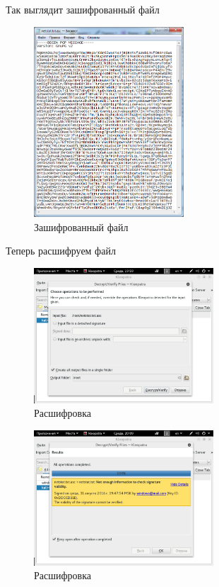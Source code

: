 Так выглядит зашифрованный файл
\begin{figure}[!ht]
	\centering
	\includegraphics[width=0.5\textwidth]{images/14.png}
	\caption{Зашифрованный файл}
\end{figure}
\newpage
Теперь расшифруем файл
\begin{figure}[!ht]
	\centering
	\includegraphics[width=0.6\textwidth]{images/16.png}
	\caption{Расшифровка}
\end{figure}
\begin{figure}[!ht]
	\centering
	\includegraphics[width=0.6\textwidth]{images/17.png}
	\caption{Расшифровка}
\end{figure}
